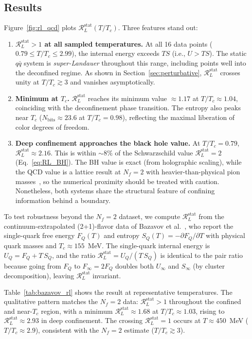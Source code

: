 \documentclass[%
 aip,
 amsmath,amssymb,
 reprint,%
]{revtex4-2}
\newcommand{\RLs}{\mathcal{R}_L^{\mathrm{stat}}}
\begin{document}
\subsection{Results}

Figure~\ref{fig:rl_qcd} plots $\RLs(T/T_c)$.
Three features stand out:

\begin{enumerate}
\item \textbf{$\RLs > 1$ at all sampled temperatures.}
At all 16 data points ($0.79 \leq T/T_c \leq 2.99$), the
internal energy exceeds $TS$ (i.e., $U > TS$).  The static
$q\bar{q}$ system is \emph{super-Landauer} throughout this
range, including points well into the deconfined regime.
As shown in Section~\ref{sec:perturbative}, $\RLs$ crosses
unity at $T/T_c \gtrsim 3$ and vanishes asymptotically.

\item \textbf{Minimum at $T_c$.}
$\RLs$ reaches its minimum value $\approx 1.17$ at
$T/T_c \approx 1.04$, coinciding with the deconfinement phase
transition.  The entropy also peaks near $T_c$
($N_{\mathrm{bits}} \approx 23.6$ at $T/T_c = 0.98$), reflecting the
maximal liberation of color degrees of freedom.

\item \textbf{Deep confinement approaches the black hole value.}
At $T/T_c = 0.79$, $\RLs \approx 2.16$.  This is within $\sim 8\%$
of the Schwarzschild value $\RLs = 2$ (Eq.~\ref{eq:RL_BH}).
The BH value is exact (from holographic scaling), while the QCD value
is a lattice result at $N_f = 2$ with heavier-than-physical pion
masses~\cite{KZ2005a}, so the numerical proximity should
be treated with caution.
Nonetheless, both systems share the structural feature of confining
information behind a boundary.
\end{enumerate}

To test robustness beyond the $N_f = 2$ dataset, we compute
$\RLs$ from the continuum-extrapolated (2+1)-flavor data of
Bazavov et al.~\cite{Bazavov2016}, who report the single-quark
free energy $F_Q(T)$ and entropy $S_Q(T) = -\partial F_Q/\partial T$
with physical quark masses and $T_c \approx 155$~MeV.  The
single-quark internal energy is $U_Q = F_Q + T\,S_Q$, and the
ratio $\RLs = U_Q/(T\,S_Q)$ is identical to the pair ratio
because going from $F_Q$ to $F_\infty = 2F_Q$ doubles both
$U_\infty$ and $S_\infty$ (by cluster decomposition), leaving
$\RLs$ invariant.

Table~\ref{tab:bazavov_rl} shows the result at representative
temperatures.  The qualitative pattern matches the $N_f = 2$ data:
$\RLs > 1$ throughout the confined and near-$T_c$ region, with a
minimum $\RLs \approx 1.68$ at $T/T_c \approx 1.03$, rising to
$\RLs \approx 2.93$ in deep confinement.  The crossing
$\RLs = 1$ occurs at $T \approx 450$~MeV ($T/T_c \approx 2.9$),
consistent with the $N_f = 2$ estimate ($T/T_c \gtrsim 3$).
\end{document}
